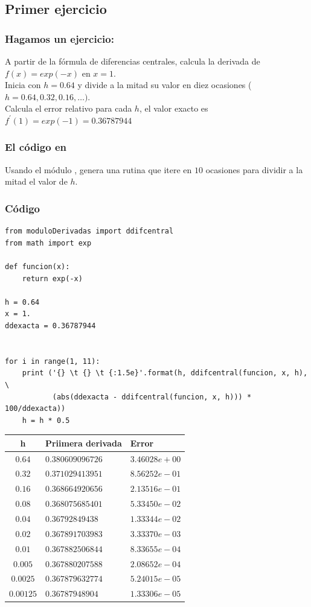 \subsection*{Primer ejercicio}
\begin{frame}
\frametitle{Hagamos un ejercicio:}
A partir de la fórmula de diferencias centrales, calcula la derivada de $f(x)=exp(-x)$ en $x = 1$.
\\
\bigskip
Inicia con $h = 0.64$ y divide a la mitad su valor en diez ocasiones ($h = 0.64, 0.32, 0.16, \ldots)$. 
\\
\bigskip
Calcula el error relativo para cada $h$, el valor exacto es $f^{\prime}(1) = exp(-1) = 0.36787944$
\end{frame}
\begin{frame}
\frametitle{El código en \python}
Usando el módulo , genera una rutina que itere en $10$ ocasiones para dividir a la mitad el valor de $h$.
\end{frame}
\begin{frame}
\frametitle{Código}
\begin{lstlisting}[caption=Usando el módulo de diferenciación, style=FormattedNumber, basicstyle=\linespread{1.1}\ttfamily=\small, columns=fullflexible]
from moduloDerivadas import ddifcentral
from math import exp

def funcion(x):
    return exp(-x)
    
h = 0.64
x = 1.
ddexacta = 0.36787944


for i in range(1, 11):
    print ('{} \t {} \t {:1.5e}'.format(h, ddifcentral(funcion, x, h), \
           (abs(ddexacta - ddifcentral(funcion, x, h))) * 100/ddexacta))
    h = h * 0.5
\end{lstlisting}
\end{frame}
\begin{frame}
\fontsize{12}{12}\selectfont
\begin{center}
\begin{tabular}{c | l | l}
\hline
h & Priimera derivada & Error \\ \hline
$0.64$ & $0.380609096726$ & $3.46028e+00$ \\ \hline
$0.32$ & $0.371029413951$ & $8.56252e-01$ \\ \hline
$0.16$ & $0.368664920656$ & $2.13516e-01$ \\ \hline
$0.08$ & $0.368075685401$ & $5.33450e-02$ \\ \hline
$0.04$ & $0.36792849438$ & $1.33344e-02$ \\ \hline
$0.02$ & $0.367891703983$ & $3.33370e-03$ \\ \hline
$0.01$ & $0.367882506844$ & $8.33655e-04$ \\ \hline
$0.005$ & $0.367880207588$ & $2.08652e-04$ \\ \hline
$0.0025$ & $0.367879632774$ & $5.24015e-05$ \\ \hline
$0.00125$ & $0.36787948904$ & $1.33306e-05$ \\ \hline
\end{tabular}
\end{center}
\end{frame}
